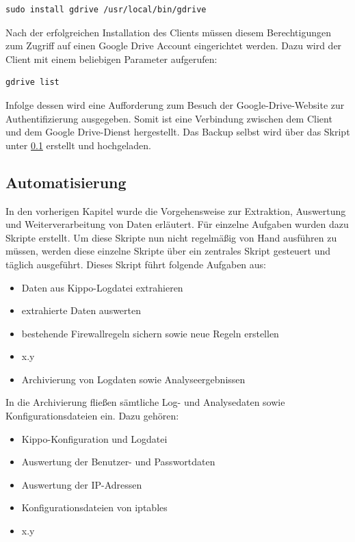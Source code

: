 \begin{lstlisting}[style=customc]
sudo install gdrive /usr/local/bin/gdrive
\end{lstlisting}

Nach der erfolgreichen Installation des Clients müssen diesem Berechtigungen zum Zugriff auf einen Google Drive Account eingerichtet werden. Dazu wird der Client mit einem beliebigen Parameter aufgerufen:

\begin{lstlisting}[style=customc]
gdrive list
\end{lstlisting}

Infolge dessen wird eine Aufforderung zum Besuch der Google-Drive-Website zur Authentifizierung ausgegeben. Somit ist eine Verbindung zwischen dem Client und dem Google Drive-Dienst hergestellt. Das Backup selbst wird über das Skript unter \ref{subsec:Automatisierung} erstellt und hochgeladen.


\subsection{Automatisierung}
\label{subsec:Automatisierung}

In den vorherigen Kapitel wurde die Vorgehensweise zur Extraktion, Auswertung und Weiterverarbeitung von Daten erläutert. Für einzelne Aufgaben wurden dazu Skripte erstellt. Um diese Skripte nun nicht regelmäßig von Hand ausführen zu müssen, werden diese einzelne Skripte über ein zentrales Skript gesteuert und täglich ausgeführt. Dieses Skript führt folgende Aufgaben aus:

\begin{itemize}
\item Daten aus Kippo-Logdatei extrahieren
\item extrahierte Daten auswerten
\item bestehende Firewallregeln sichern sowie neue Regeln erstellen
\item x.y
\item Archivierung von Logdaten sowie Analyseergebnissen
\end{itemize}

In die Archivierung fließen sämtliche Log- und Analysedaten sowie Konfigurationsdateien ein. Dazu gehören:

\begin{itemize}
\item Kippo-Konfiguration und Logdatei
\item Auswertung der Benutzer- und Passwortdaten
\item Auswertung der IP-Adressen
\item Konfigurationsdateien von iptables
\item x.y
\end{itemize}

